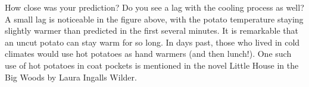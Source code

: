 \documentclass{ximera}
\begin{document}
How close was your prediction?  Do you see a lag with the cooling process as well?  A small lag is noticeable in the figure above, with the potato temperature staying slightly warmer than predicted in the first several minutes.  It is remarkable that an uncut potato can stay warm for so long.  In days past, those who lived in cold climates would use hot potatoes as hand warmers (and then lunch!).  One such use of hot potatoes in coat pockets is mentioned in the novel Little House in the Big Woods by Laura Ingalls Wilder.
 
 
 
\end{document}
